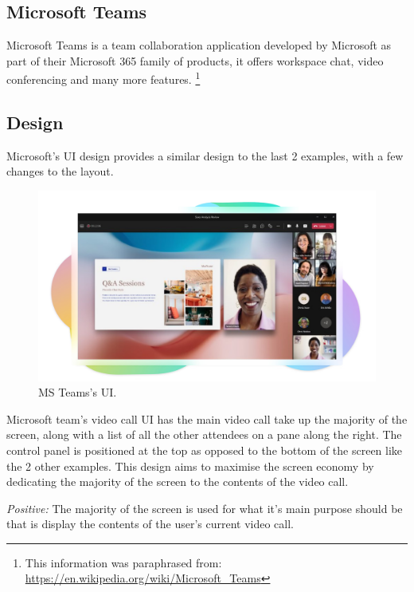 \subsection{Microsoft Teams}

Microsoft Teams is a team collaboration application developed by 
Microsoft as part of their Microsoft 365 family of products, it offers
workspace chat, video conferencing and many more features.
\footnote{This information was paraphrased from:
\url{https://en.wikipedia.org/wiki/Microsoft_Teams}}

\subsection*{Design}

Microsoft's UI design provides a similar design to the last 
2 examples, with a few changes to the layout.

\begin{figure}[H]

\centering
\includegraphics[scale=0.12]{Images/MSTeams.png}

\caption{MS Teams's UI.}
\label{fig:Teams}

\end{figure}

Microsoft team's video call UI has the main video call take up the
majority of the screen, along with a list of all the other 
attendees on a pane along the right. The control panel is 
positioned at the top as opposed to the bottom of the screen like 
the 2 other examples. This design aims to maximise the screen economy 
by dedicating the majority of the screen to the contents of the 
video call. \\ \vspace{0.2cm}

\textit{Positive:} The majority of the screen is used for what it's 
main purpose should be that is display the contents of the user's 
current video call.
\\ \vspace{0.2cm}

